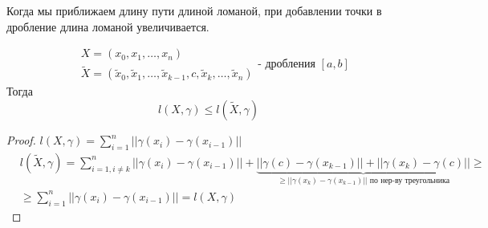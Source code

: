 \documentclass[../main.tex]{subfiles}
\begin{document}
\begin{note}
    \hypertarget{add_point_in_x}{Когда мы приближаем длину пути длиной ломаной, при добавлении точки в дробление длина ломаной увеличивается. }

    \begin{equation*}
        \begin{aligned}
            &X=\left( x_0, x_1, \dots, x_n\right)\\ 
            &\tilde{ X}=(\tilde{ x}_0, \tilde{ x}_1, \dots, \tilde{ x}_{k-1},c, \tilde{ x}_k, \dots, \tilde{ x}_n)
        \end{aligned}
        \text{- дробления } \left[ a,b\right]
    \end{equation*}
    Тогда 
    \[ l \left( X, \gamma \right) \leq l( \tilde{ X}, \gamma ) \]
\end{note}
\begin{proof}
    \(l\left( X, \gamma \right)= \sum\limits_{ i=1}^{ n} \left| \left| \gamma \left( x_i\right)- \gamma \left( x_{i-1}\right)\right|\right|\)\\
    \begin{equation*}
        \begin{aligned}
            &l( \tilde{ X}, \gamma)= \sum\limits_{i=1, i \neq k}^{n} \left| \left| \gamma \left( x_i\right)- \gamma \left( x_{i-1}\right)\right|\right|+ \underbrace{\left| \left| \gamma \left( c\right)- \gamma \left( x_{k-1}\right)\right|\right|+\left| \left| \gamma \left( x_k\right)- \gamma \left( c\right)\right|\right|}_{ \geq \left| \left| \gamma \left( x_k\right)- \gamma \left( x_{k-1}\right)\right|\right| \text{ по нер-ву треугольника}} \geq\\
            &\geq \sum\limits_{ i=1}^{ n} \left| \left| \gamma \left( x_i\right)- \gamma \left( x_{i-1}\right)\right|\right|=l \left( X, \gamma \right)
        \end{aligned}
    \end{equation*}
\end{proof}
\end{document}
